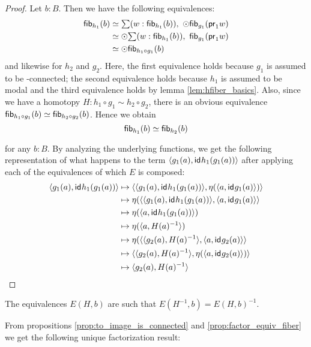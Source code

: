\begin{proof}
Let $b:B$. Then we have the following equivalences:
\begin{align*}
\hfib{h_1}b & \simeq \sm{w:\hfib{h_1}b} \modal \hfib{g_1}{\proj1 w}\\
& \simeq \modal\sm{w:\hfib{h_1}b}\hfib{g_1}{\proj1 w}\\
& \simeq \modal\hfib{h_1\circ g_1}b
\end{align*}
and likewise for $h_2$ and $g_2$. Here, the first equivalence holds because $g_1$ is assumed to be \modal-connected; the second equivalence
holds because $h_1$ is assumed to be modal and the third equivalence holds by lemma \ref{lem:hfiber_basics}. Also, since we have a
homotopy $H:h_1\circ g_1\sim h_2\circ g_2$, there is an obvious equivalence $\mathsf{fib}_{h_1\circ g_1}(b)\simeq\mathsf{fib}_{h_2\circ g_2}(b)$. Hence we
obtain
\begin{equation*}
\mathsf{fib}_{h_1}(b)\simeq\mathsf{fib}_{h_2}(b)
\end{equation*}
               
for any $b:B$. By analyzing the underlying functions, we get the following representation of what happens to the term
${\langle g_1(a),\mathsf{id}_{}{h_1(g_1(a))}\rangle}$ after applying each of the equivalences of which $E$ is composed:
\begin{align*}
\pairr{g_1(a),\idfunc{h_1(g_1(a))}} & 
    \mapsto \pairr{\pairr{g_1(a),\idfunc{h_1(g_1(a))}}, \eta( \pairr{a,\idfunc{g_1(a)}} )}\\
  & \mapsto \eta( \pairr{\pairr{g_1(a),\idfunc{h_1(g_1(a))}}, \pairr{a,\idfunc{g_1(a)}} }\\
  & \mapsto \eta( \pairr{a,\idfunc{h_1(g_1(a))}})\\
  & \mapsto \eta( \pairr{a,H(a)^{-1}})\\
  & \mapsto \eta( \pairr{\pairr{g_2(a),H(a)^{-1}},\pairr{a,\idfunc{g_2(a)}}}\\
  & \mapsto \pairr{\pairr{g_2(a),H(a)^{-1}}, \eta(\pairr{a,\idfunc{g_2(a)}}) }\\
  & \mapsto \pairr{g_2(a),H(a)^{-1}}
\end{align*}
\end{proof}

The equivalences $E(H,b)$ are such that $E(H^{-1},b)= E(H,b)^{-1}$.

From propositions \ref{prop:to_image_is_connected} and \ref{prop:factor_equiv_fiber} we get the following unique factorization result:

